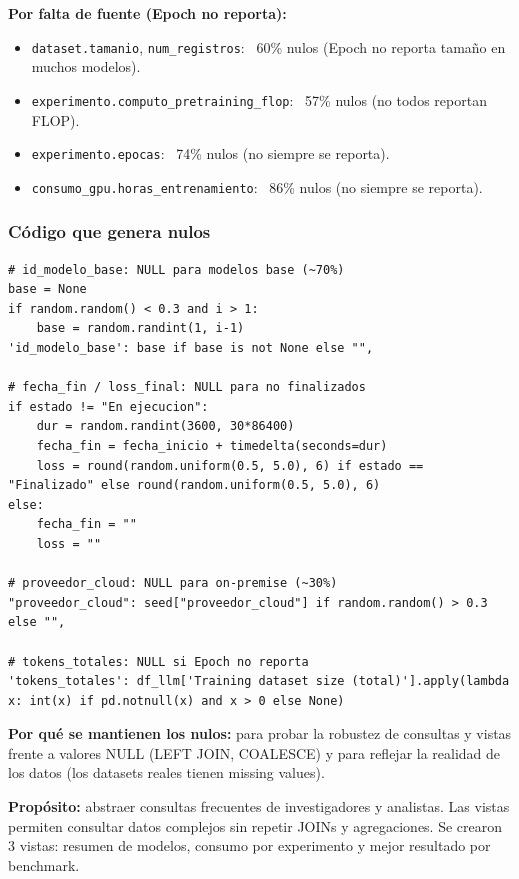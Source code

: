 \documentclass[12pt,a4paper]{article}
\begin{document}
\textbf{Por falta de fuente (Epoch no reporta):}
\begin{itemize}
  \item \texttt{dataset.tamanio}, \texttt{num\_registros}: ~60\% nulos (Epoch no reporta tamaño en muchos modelos).
  \item \texttt{experimento.computo\_pretraining\_flop}: ~57\% nulos (no todos reportan FLOP).
  \item \texttt{experimento.epocas}: ~74\% nulos (no siempre se reporta).
  \item \texttt{consumo\_gpu.horas\_entrenamiento}: ~86\% nulos (no siempre se reporta).
\end{itemize}

\subsubsection{Código que genera nulos}

\begin{lstlisting}
# id_modelo_base: NULL para modelos base (~70%)
base = None
if random.random() < 0.3 and i > 1:
    base = random.randint(1, i-1)
'id_modelo_base': base if base is not None else "",

# fecha_fin / loss_final: NULL para no finalizados
if estado != "En ejecucion":
    dur = random.randint(3600, 30*86400)
    fecha_fin = fecha_inicio + timedelta(seconds=dur)
    loss = round(random.uniform(0.5, 5.0), 6) if estado == "Finalizado" else round(random.uniform(0.5, 5.0), 6)
else:
    fecha_fin = ""
    loss = ""

# proveedor_cloud: NULL para on-premise (~30%)
"proveedor_cloud": seed["proveedor_cloud"] if random.random() > 0.3 else "",

# tokens_totales: NULL si Epoch no reporta
'tokens_totales': df_llm['Training dataset size (total)'].apply(lambda x: int(x) if pd.notnull(x) and x > 0 else None)
\end{lstlisting}

\textbf{Por qué se mantienen los nulos:} para probar la robustez de consultas y vistas frente a valores NULL (LEFT JOIN, COALESCE) y para reflejar la realidad de los datos (los datasets reales tienen missing values).

\textbf{Propósito:} abstraer consultas frecuentes de investigadores y analistas. Las vistas permiten consultar datos complejos sin repetir JOINs y agregaciones. Se crearon 3 vistas: resumen de modelos, consumo por experimento y mejor resultado por benchmark.
\end{document}
